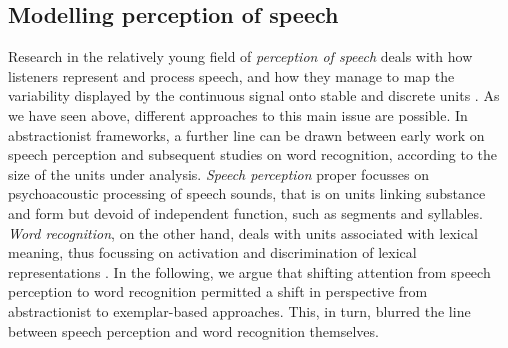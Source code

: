 \subsection{Modelling perception of speech}\label{sec111}
Research in the relatively young field of \textit{perception of speech} deals with how listeners represent and process speech, and how they manage to map the variability displayed by the continuous signal onto stable and discrete units \citep{jusczyk2002speech}. As we have seen above, different approaches to this main issue are possible. In abstractionist frameworks, a further line can be drawn between early work on speech perception and subsequent studies on word recognition, according to the size of the units under analysis. \textit{Speech perception} proper focusses on psychoacoustic processing of speech sounds, that is on units linking substance and form but devoid of independent function, such as segments and syllables. \textit{Word recognition}, on the other hand, deals with units associated with lexical meaning, thus focussing on activation and discrimination of lexical representations \citep{luce2003abstractness}. In the following, we argue that shifting attention from speech perception to word recognition permitted a shift in perspective from abstractionist to exemplar-based approaches. This, in turn, blurred the line between speech perception and word recognition themselves. 

